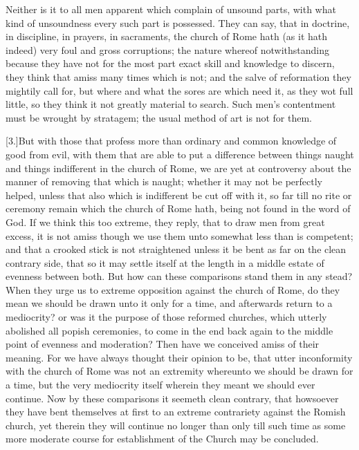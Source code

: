 Neither is it to all men apparent which complain of unsound parts, with what kind of unsoundness every such part is possessed. They can say, that in doctrine, in discipline, in prayers, in sacraments, the church of Rome hath (as it hath indeed) very foul and gross corruptions; the nature whereof notwithstanding because they have not for the most part exact skill and knowledge to discern, they think that amiss many times which is not; and the salve of reformation they mightily call for, but where and what the sores are which need it, as they wot full little, so they think it not greatly material to search. Such men’s contentment must be wrought by stratagem; the usual method of art is not for them.

[3.]But with those that profess more than ordinary and common knowledge of good from evil, with them that are able to put a difference between things naught and things indifferent in the church of Rome, we are yet at controversy about the manner of removing that which is naught; whether it may not be perfectly helped, unless that also which is indifferent be cut off with it, so far till no rite or ceremony remain which the church of Rome hath, being not found in the word of God. If we think this too extreme, they reply, that to draw men from great excess, it is not amiss though we  use them unto somewhat less than is competent; and that a crooked stick is not straightened unless it be bent as far on the clean contrary side, that so it may settle itself at the length in a middle estate of evenness between both. But how can these comparisons stand them in any stead? When they urge us to extreme opposition against the church of Rome, do they mean we should be drawn unto it only for a time, and afterwards return to a mediocrity? or was it the purpose of those reformed churches, which utterly abolished all popish ceremonies, to come in the end back again to the middle point of evenness and moderation? Then have we conceived amiss of their meaning. For we have always thought their opinion to be, that utter inconformity with the church of Rome was not an extremity whereunto we should be drawn for a time, but the very mediocrity itself wherein they meant we should ever continue. Now by these comparisons it seemeth clean contrary, that howsoever they have bent themselves at first to an extreme contrariety against the Romish church, yet therein they will continue no longer than only till such time as some more moderate course for establishment of the Church may be concluded.

